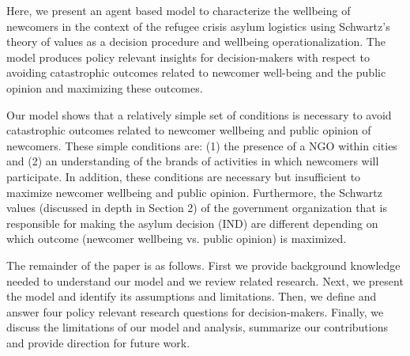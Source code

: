 \documentclass{scspaperproc}
\theoremstyle{scsthe}
\begin{document}


Here, we present an agent based model to characterize the wellbeing of newcomers in the context of the refugee crisis asylum logistics using Schwartz's theory of values as a decision procedure and wellbeing operationalization. The model produces policy relevant insights for decision-makers with respect to avoiding catastrophic outcomes related to newcomer well-being and the public opinion and maximizing these outcomes.

Our model shows that a relatively simple set of conditions is necessary to avoid catastrophic outcomes related to newcomer wellbeing and public opinion of newcomers. These simple conditions are: (1) the presence of a NGO within cities and (2) an understanding of the brands of activities in which newcomers will participate. In addition, these conditions are necessary but insufficient to maximize newcomer wellbeing and public opinion. Furthermore, the Schwartz values (discussed in depth in Section 2) of the government organization that is responsible for making the asylum decision (IND) are different depending on which outcome (newcomer wellbeing vs. public opinion) is maximized. 

The remainder of the paper is as follows. First we provide background knowledge needed to understand our model and we review related research. Next, we present the model and identify its assumptions and limitations. Then, we define and answer four policy relevant research questions for decision-makers. Finally, we discuss the limitations of our model and analysis, summarize our contributions and provide direction for future work.
\end{document}
